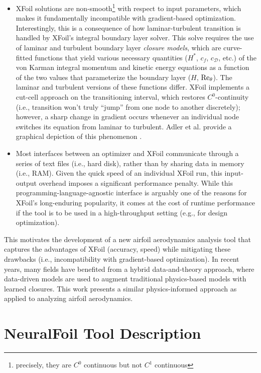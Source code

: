 \documentclass[conf]{new-aiaa}
\begin{document}
\begin{itemize}
        \item XFoil solutions are non-smooth\footnote{precisely, they are $C^0$ continuous but not $C^1$ continuous} with respect to input parameters, which makes it fundamentally incompatible with gradient-based optimization. Interestingly, this is a consequence of how laminar-turbulent transition is handled by XFoil's integral boundary layer solver. This solve requires the use of laminar and turbulent boundary layer \emph{closure models}, which are curve-fitted functions that yield various necessary quantities ($H^*$, $c_f$, $c_\mathcal{D}$, etc.) of the von Karman integral momentum and kinetic energy equations as a function of the two values that parameterize the boundary layer ($H$, $\rm Re_\theta$). The laminar and turbulent versions of these functions differ. XFoil implements a cut-cell approach on the transitioning interval, which restores $C^0$-continuity (i.e., transition won't truly ``jump'' from one node to another discretely); however, a sharp change in gradient occurs whenever an individual node switches its equation from laminar to turbulent. Adler et al. provide a graphical depiction of this phenomenon \cite{adler_cfd_2022}.
        \item Most interfaces between an optimizer and XFoil communicate through a series of text files (i.e., hard disk), rather than by sharing data in memory (i.e., RAM). Given the quick speed of an individual XFoil run, this input-output overhead imposes a significant performance penalty. While this programming-language-agnostic interface is arguably one of the reasons for XFoil's long-enduring popularity, it comes at the cost of runtime performance if the tool is to be used in a high-throughput setting (e.g., for design optimization).
    \end{itemize}

    This motivates the development of a new airfoil aerodynamics analysis tool that captures the advantages of XFoil (accuracy, speed) while mitigating these drawbacks (i.e., incompatibility with gradient-based optimization). In recent years, many fields have benefited from a hybrid data-and-theory approach, where data-driven models are used to augment traditional physics-based models with learned closures. This work presents a similar physics-informed approach as applied to analyzing airfoil aerodynamics.



    \section{NeuralFoil Tool Description}
\end{document}
